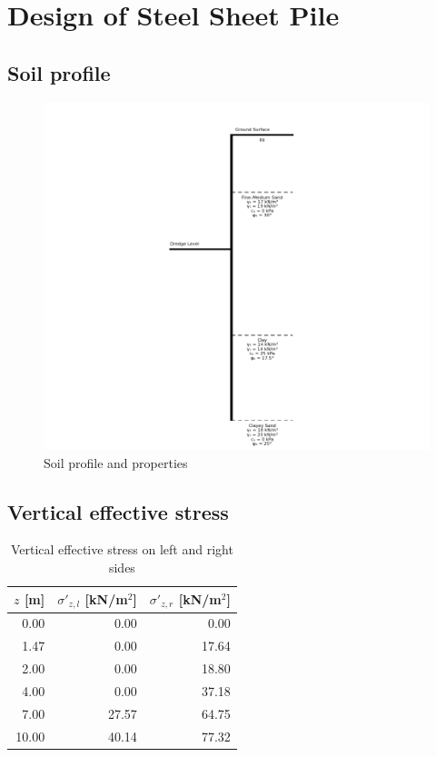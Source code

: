 \chapter{Design of Steel Sheet Pile}

\section{Soil profile}

\begin{figure}[H]
    \centering
    \includegraphics[width=0.90\linewidth]{figures/ch8/soil_profile.png}
    \caption{Soil profile and properties}
    \label{fig:soil_profile_cross_section}
\end{figure}

\section{Vertical effective stress}

\begin{table}[H]
  \centering
  \caption{Vertical effective stress on left and right sides}
  \label{tab:appendix_effective_stress}
  \small
  \setlength{\tabcolsep}{8pt}
  \renewcommand{\arraystretch}{1.15}
  \begin{tabular}{@{}r r r@{}}
    \toprule
    $z$ [m] &
    $\sigma'_{z,l}$ [kN/m$^2$] &
    $\sigma'_{z,r}$ [kN/m$^2$] \\
    \midrule
     0.00 &  0.00 &  0.00 \\
     1.47 &  0.00 & 17.64 \\
     2.00 &  0.00 & 18.80 \\
     4.00 &  0.00 & 37.18 \\
     7.00 & 27.57 & 64.75 \\
    10.00 & 40.14 & 77.32 \\
    \bottomrule
  \end{tabular}
\end{table}

